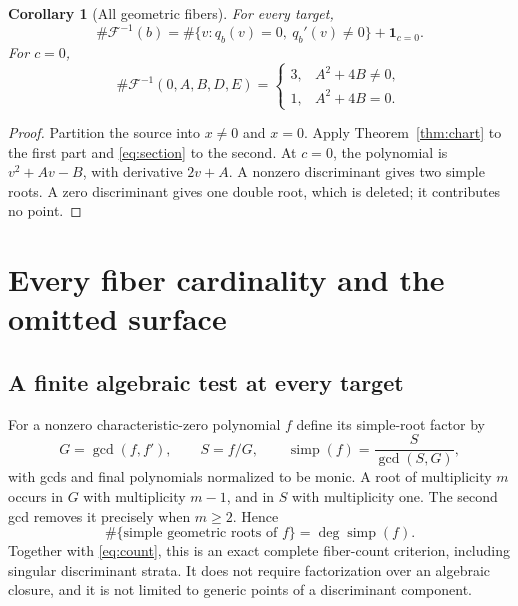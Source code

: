 \documentclass[11pt,a4paper]{article}
\newtheorem{corollary}[theorem]{Corollary}
\theoremstyle{definition}
\newcommand{\simp}{\operatorname{simp}}
\newcommand{\F}{\mathcal F}
\begin{document}
\begin{corollary}[All geometric fibers]\label{cor:count}
For every target,
\begin{equation}\label{eq:count}
 \#\F^{-1}(b)=\#\{v:q_b(v)=0,\ q_b'(v)\ne0\}+\mathbf1_{c=0}.
\end{equation}
For $c=0$,
\begin{equation}\label{eq:c0count}
 \#\F^{-1}(0,A,B,D,E)=
 \begin{cases}3,&A^2+4B\ne0,\\1,&A^2+4B=0.\end{cases}
\end{equation}
\end{corollary}
\begin{proof}
Partition the source into $x\ne0$ and $x=0$. Apply
Theorem~\ref{thm:chart} to the first part and \eqref{eq:section} to the
second. At $c=0$, the polynomial is $v^2+Av-B$, with derivative $2v+A$.
A nonzero discriminant gives two simple roots. A zero discriminant gives
one double root, which is deleted; it contributes no point.
\end{proof}

\section{Every fiber cardinality and the omitted surface}
\label{sec:fibers}

\subsection{A finite algebraic test at every target}
For a nonzero characteristic-zero polynomial $f$ define its simple-root
factor by
\begin{equation}\label{eq:simplepart}
 G=\gcd(f,f'),\qquad S=f/G,\qquad
 \simp(f)=\frac{S}{\gcd(S,G)},
\end{equation}
with gcds and final polynomials normalized to be monic. A root of
multiplicity $m$ occurs in $G$ with multiplicity $m-1$, and in $S$ with
multiplicity one. The second gcd removes it precisely when $m\ge2$.
Hence
\[
 \#\{\text{simple geometric roots of }f\}=\deg\simp(f).
\]
Together with \eqref{eq:count}, this is an exact complete fiber-count
criterion, including singular discriminant strata. It does not require
factorization over an algebraic closure, and it is not limited to generic
points of a discriminant component.
\end{document}
